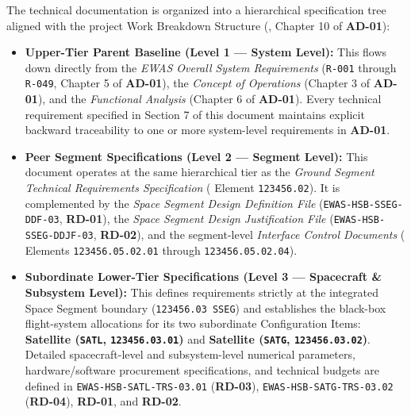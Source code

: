 The  technical documentation is organized into a hierarchical specification tree aligned with the project Work Breakdown Structure (, Chapter 10 of \textbf{AD-01}):
\begin{itemize}
    \item \textbf{Upper-Tier Parent Baseline (Level 1 --- System Level):} This  flows down directly from the \emph{EWAS Overall System Requirements} (\texttt{R-001} through \texttt{R-049}, Chapter 5 of \textbf{AD-01}), the \emph{Concept of Operations} (Chapter 3 of \textbf{AD-01}), and the \emph{Functional Analysis} (Chapter 6 of \textbf{AD-01}). Every technical requirement specified in Section 7 of this document maintains explicit backward traceability to one or more system-level requirements in \textbf{AD-01}.
    \item \textbf{Peer Segment Specifications (Level 2 --- Segment Level):} This document operates at the same hierarchical tier as the \emph{Ground Segment Technical Requirements Specification} ( Element \texttt{123456.02}). It is complemented by the \emph{Space Segment Design Definition File} (\texttt{EWAS-HSB-SSEG-DDF-03}, \textbf{RD-01}), the \emph{Space Segment Design Justification File} (\texttt{EWAS-HSB-SSEG-DDJF-03}, \textbf{RD-02}), and the segment-level \emph{Interface Control Documents} ( Elements \texttt{123456.05.02.01} through \texttt{123456.05.02.04}).
    \item \textbf{Subordinate Lower-Tier Specifications (Level 3 --- Spacecraft \& Subsystem Level):} This  defines requirements strictly at the integrated Space Segment boundary (\texttt{123456.03 SSEG}) and establishes the black-box flight-system allocations for its two subordinate Configuration Items: \textbf{Satellite  (\texttt{SATL},  \texttt{123456.03.01})} and \textbf{Satellite  (\texttt{SATG},  \texttt{123456.03.02})}. Detailed spacecraft-level and subsystem-level numerical parameters, hardware/software procurement specifications, and technical budgets are defined in \texttt{EWAS-HSB-SATL-TRS-03.01} (\textbf{RD-03}), \texttt{EWAS-HSB-SATG-TRS-03.02} (\textbf{RD-04}), \textbf{RD-01}, and \textbf{RD-02}.
\end{itemize}

